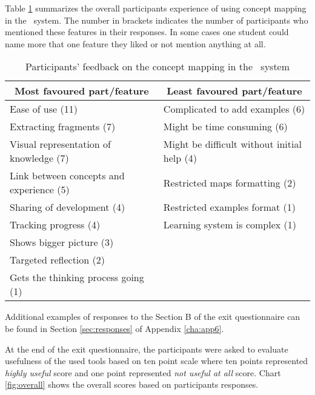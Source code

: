 Table \ref{tab:study2summary} summarizes the overall participants experience of
using concept mapping in the \ep~system. The number in brackets indicates the
number of participants who mentioned these features in their responses. In
some cases one student could name more that one feature they liked or not
mention anything at all.

\begin{table}[htb] \small
  \caption{Participants' feedback on the concept mapping in the \ep~system }
  \begin{center}
    \begin{tabular}{| p{6.5cm} | p{6.5cm} |}
    \hline
     \multicolumn{1}{|c|}{\textbf{Most favoured part/feature}} &
     \multicolumn{1}{c|}{\textbf{Least favoured part/feature}} \\
     \hline
     Ease of use (11) & Complicated to add examples (6) \\ \hline
     Extracting fragments (7) & Might be time consuming (6) \\ \hline
     Visual representation of knowledge (7) & Might be difficult without initial help (4) \\ \hline
     Link between concepts and experience (5) & Restricted maps formatting (2) \\ \hline 
     Sharing of development (4) & Restricted examples format (1) \\ \hline
     Tracking progress (4) & Learning system is complex (1) \\ \hline
     Shows bigger picture (3) &  \\ \hline
     Targeted reflection (2) & \\ \hline
     Gets the thinking process going (1) & \\ \hline
    \end{tabular}
  \end{center}
  \label{tab:study2summary}
\end{table}

Additional examples of responses to the Section B of the exit questionnaire can
be found in Section \ref{sec:responses} of Appendix \ref{cha:app6}.

At the end of the exit questionnaire, the participants were asked to evaluate
usefulness of the used tools based on ten point scale where ten points
represented \textit{highly useful} score and one point represented \textit{not
useful at all} score. Chart \ref{fig:overall} shows the overall scores based on
participants responses.


